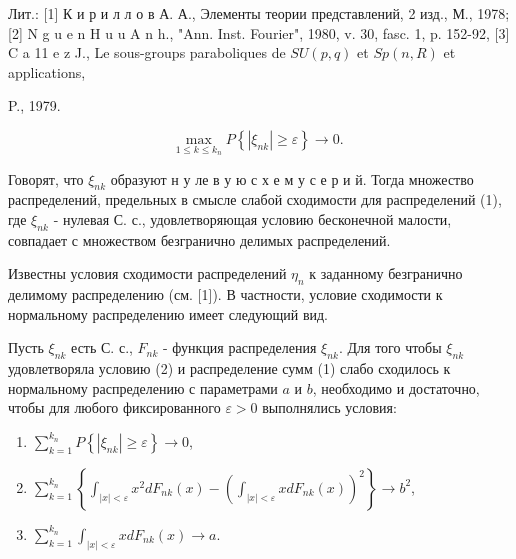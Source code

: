 \documentclass[10pt]{article}
\begin{document}
Лит.: [1] К и р и л л о в А. А., Элементы теории представлений, 2 изд., М., 1978; [2] N g u e n H u u A n h., "Ann. Inst. Fourier", 1980, v. 30, fasc. 1, p. 152-92, [3] C a 11 e z J., Le sous-groups paraboliques de $S U(p, q)$ et $S p(n, R)$ et applications,

P., 1979.



\[

\max _{1 \leqslant k \leqslant k_{n}} P\left\{\left|\xi_{n k}\right| \geqslant \varepsilon\right\} \rightarrow 0 \text {. }

\]



Говорят, что $\xi_{n k}$ образуют н у ле в у ю с х е м у с е р и й. Тогда множество распределений, предельных в смысле слабой сходимости для распределений (1), где $\xi_{n k}$ - нулевая С. с., удовлетворяющая условию бесконечной малости, совпадает с множеством безгранично делимых распределений.



Известны условия сходимости распределений $\eta_{n}$ к заданному безгранично делимому распределению (см. [1]). В частности, условие сходимости к нормальному распределению имеет следующий вид.



Пусть $\xi_{n k}$ есть С. с., $F_{n k}$ - функция распределения $\xi_{n k}$. Для того чтобы $\xi_{n k}$ удовлетворяла условию (2) и распределение сумм (1) слабо сходилось к нормальному распределению с параметрами $a$ и $b$, необходимо и достаточно, чтобы для любого фиксированного $\varepsilon>0$ выполнялись условия:



\begin{enumerate}

  \item $\sum_{k=1}^{k_{n}} P\left\{\left|\xi_{n k}\right| \geqslant \varepsilon\right\} \rightarrow 0$,



  \item $\sum_{k=1}^{k_{n}}\left\{\int_{|x|<\varepsilon} x^{2} d F_{n k}(x)-\left(\int_{|x|<\varepsilon} x d F_{n k}(x)\right)^{2}\right\} \rightarrow b^{2}$,



  \item $\sum_{k=1}^{k_{n}} \int_{|x|<\varepsilon} x d F_{n k}(x) \rightarrow a$.



\end{enumerate}
\end{document}
